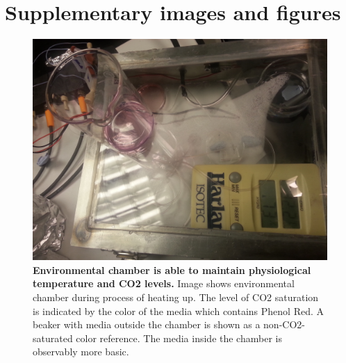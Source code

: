 \section{Supplementary images and figures}
        \begin{figure}[!h]
            \centering
            \includegraphics[width=15cm]{chapter2/figures/Chamber/ChamberInOperation.jpg}
            \caption[Image of environmental chamber]{\textbf{Environmental chamber is able to maintain physiological temperature and CO\textsc{2} levels.} Image shows environmental chamber during process of heating up. The level of CO\textsc{2} saturation is indicated by the color of the media which contains Phenol Red. A beaker with media outside the chamber is shown as a non-CO\textsc{2}-saturated color reference. The media inside the chamber is observably more basic.}
            \label{fig:app:chamber}

        \end{figure}
        
